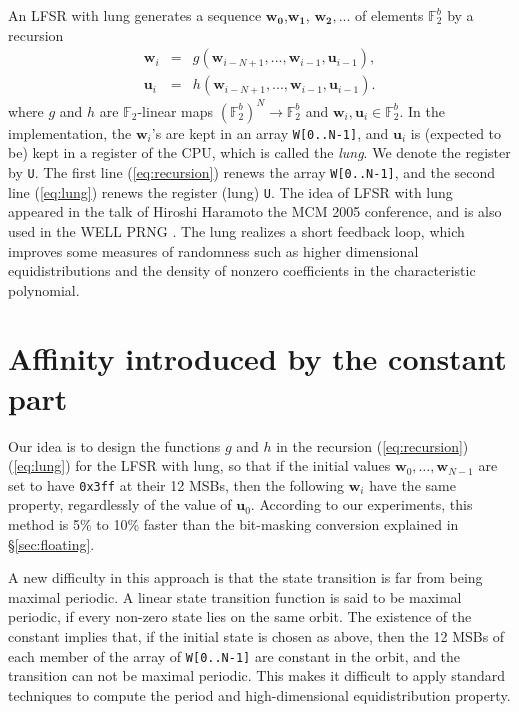 \documentclass{svmult}
\begin{document}
An LFSR with lung generates a sequence
$\mathbf{w_0}$,$\mathbf{w_1}$, $\mathbf{w_2},...$ of elements
${\mathbb F}_2^b$ by a recursion
\begin{eqnarray}
  \mathbf{w}_i &=& g(\mathbf{w}_{i-N+1}, ..., \mathbf{w}_{i-1},
  \mathbf{u}_{i-1}), \label{eq:recursion} \\
  \mathbf{u}_i &=& h(\mathbf{w}_{i-N+1}, ..., \mathbf{w}_{i-1},
  \mathbf{u}_{i-1}). \label{eq:lung}
\end{eqnarray}
where $g$ and $h$ are ${\mathbb F}_2$-linear maps $({\mathbb F}_2^{b})^N \rightarrow
{\mathbb F}_2^b$ and $\mathbf{w}_i, \mathbf{u}_i \in {\mathbb F}_2^b$.  In the
implementation, the $\mathbf{w}_i$'s are kept in an array
\texttt{W[0..N-1]}, and $\mathbf{u}_i$
is (expected to be) kept in a register of
the CPU, which is called the {\em lung}. We denote the register
by \texttt{U}. The first line (\ref{eq:recursion})
renews the array \texttt{W[0..N-1]}, and the second line (\ref{eq:lung}) renews
the register (lung) \texttt{U}.
The idea of LFSR with lung appeared in the talk of Hiroshi
Haramoto the MCM 2005 conference, and is also used in the WELL PRNG \cite{WELL}.
The lung realizes a short feedback loop, which improves
some measures of randomness such as higher dimensional
equidistributions and the density of nonzero coefficients
in the characteristic polynomial.

\section{Affinity introduced by the constant part}\label{sec:affine}
Our idea is to design the functions $g$ and $h$ in
the recursion (\ref{eq:recursion})
(\ref{eq:lung}) for the LFSR with lung, so that if the initial
values $\mathbf{w}_0, \ldots, \mathbf{w}_{N-1}$ are set to
have \texttt{0x3ff} at their 12 MSBs, then the following
$\mathbf{w}_i$ have the same property, regardlessly of
the value of $\mathbf{u}_0$. According to our experiments,
this method is 5\% to 10\% faster than the bit-masking
conversion explained in \S\ref{sec:floating}.

A new difficulty in this approach is that
the state transition is far from being maximal periodic.
A linear state transition function is said to be
maximal periodic, if every non-zero state lies on
the same orbit. The existence of the constant implies that, if
the initial state is chosen as above, then the 12 MSBs
of each member of the array of \texttt{W[0..N-1]}
are constant in the orbit, and the transition can not be
maximal periodic. This makes it difficult to apply
standard techniques to compute the period and
high-dimensional equidistribution property.
\end{document}
